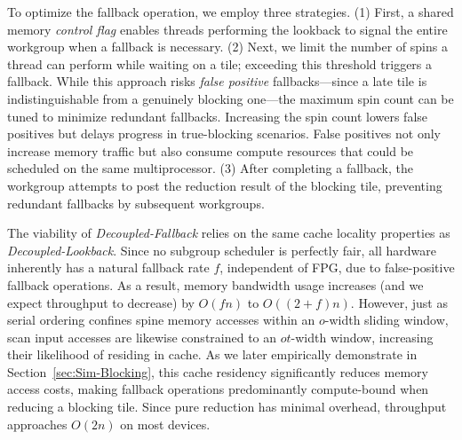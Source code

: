 \documentclass[sigconf]{acmart}
\begin{document}
To optimize the fallback operation, we employ three strategies. (1) First, a shared memory \emph{control flag} enables threads performing the lookback to signal the entire workgroup when a fallback is necessary. (2) Next, we limit the number of spins a thread can perform while waiting on a tile; exceeding this threshold triggers a fallback. While this approach risks \emph{false positive} fallbacks---since a late tile is indistinguishable from a genuinely blocking one---the maximum spin count can be tuned to minimize redundant fallbacks. Increasing the spin count lowers false positives but delays progress in true-blocking scenarios. False positives not only increase memory traffic but also consume compute resources that could be scheduled on the same multiprocessor. (3) After completing a fallback, the workgroup attempts to post the reduction result of the blocking tile, preventing redundant fallbacks by subsequent workgroups.

The viability of \emph{Decoupled-Fallback} relies on the same cache locality properties as \emph{Decoupled-Lookback}. Since no subgroup scheduler is perfectly fair, all hardware inherently has a natural fallback rate $f$\!, independent of FPG, due to false-positive fallback operations. As a result, memory bandwidth usage increases (and we expect throughput to decrease) by $O(fn)$ to $O((2 + f)n)$. However, just as serial ordering confines spine memory accesses within an $o$-width sliding window, scan input accesses are likewise constrained to an $ot$-width window, increasing their likelihood of residing in cache. As we later empirically demonstrate in Section~\ref{sec:Sim-Blocking}, this cache residency significantly reduces memory access costs, making fallback operations predominantly compute-bound when reducing a blocking tile. Since pure reduction has minimal overhead, throughput approaches $O(2n)$ on most devices.
\end{document}

